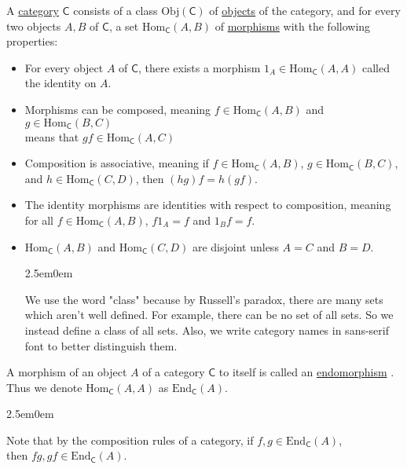 \documentclass{book}
\newcommand{\hTwo}{%
   \color{MidnightBlue}%
   \fontsize{13}{15}\selectfont%
}
\newenvironment{myIndent}{%
   \begin{adjustwidth}{2.5em}{0em}%
}{%
   \end{adjustwidth}%
}
\newcommand{\udefine}[1]{{%
   \setulcolor{Red}%
   \setul{0.14em}{0.07em}%
   \ul{#1}%
}}
\newcommand{\myObj}{\mathrm{Obj}}
\newcommand{\myHom}{\mathrm{Hom}}
\newcommand{\myEnd}{\mathrm{End}}
\newcommand{\mcateg}[1]{{\bm{\mathsf{#1}}}}
\newcommand{\retTwo}{\hfill\bigbreak}
\begin{document}
   A \udefine{category} $\mcateg{C}$ consists of a class $\myObj(\mcateg{C})$ of \udefine{objects} of the category, and for every\\ two objects $A, B$ of $\mcateg{C}$, a set $\myHom_\mcateg{C}(A, B)$ of \udefine{morphisms} with the following\\ properties:
   \begin{itemize}
      \item For every object $A$ of $\mcateg{C}$, there exists a morphism $1_A \in \myHom_\mcateg{C}(A, A)$ called\\ the identity on $A$.
      \item Morphisms can be composed, meaning $f \in \myHom_\mcateg{C}(A, B)$ and $g \in \myHom_\mcateg{C}(B, C)$\\ means that $gf \in \myHom_\mcateg{C}(A, C)$
      \item Composition is associative, meaning if $f \in \myHom_\mcateg{C}(A, B)$, $g \in \myHom_\mcateg{C}(B, C)$,\\ and $h \in \myHom_\mcateg{C}(C, D)$, then $(hg)f = h(gf)$.
      \item The identity morphisms are identities with respect to composition, meaning\\ for all $f \in \myHom_\mcateg{C}(A, B)$, $f1_A = f$ and $1_Bf = f$.
      \item $\myHom_\mcateg{C}(A, B)$ and $\myHom_\mcateg{C}(C, D)$ are disjoint unless $A = C$ and $B = D$.
      
      {\begin{myIndent} \hTwo
         We use the word "class" because by Russell's paradox, there are many sets\\ which aren't well defined. For example, there can be no set of all sets. So we\\ instead define a class of all sets. \retTwo
         Also, we write category names in sans-serif font to better distinguish them.
      \end{myIndent}}
   \end{itemize}

   A morphism of an object $A$ of a category $\mcateg{C}$ to itself is called an \udefine{endomorphism}.\\ Thus we denote $\myHom_\mcateg{C}(A, A)$ as $\myEnd_\mcateg{C}(A)$.
   {\begin{myIndent} \hTwo
      Note that by the composition rules of a category, if $f, g \in \myEnd_\mcateg{C}(A)$,\\ then $fg, gf \in \myEnd_\mcateg{C}(A)$.\retTwo
   \end{myIndent}}
\end{document}
